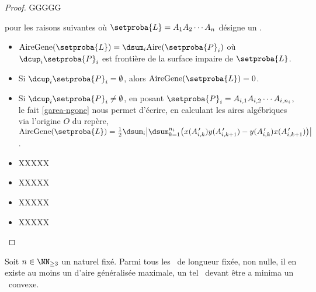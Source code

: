 \begin{proof}
	GGGGG
	
	
	pour les raisons suivantes où $\setproba{L} = A_1 A_2 \cdots A_n$ désigne un \ncycle.
    \begin{itemize}
        \item $\garea{\setproba{L}} = \dsum_{i} \area{\setproba{P}_i}$ où $\dcup_{i} \setproba{P}_i$ est frontière de la surface impaire de $\setproba{L}$.


		\item Si $\dcup_{i} \setproba{P}_i = \emptyset$, alors $\garea{\setproba{L}} = 0$.


		\item Si $\dcup_{i} \setproba{P}_i \neq \emptyset$, 
		en posant $\setproba{P}_i = A_{i,1} A_{i,2} \cdots A_{i,n_i}$, 
		le fait \ref{garea-ngone} nous permet d'écrire, en calculant les aires algébriques via l'origine $O$ du repère,
		$ \garea{\setproba{L}} 
		= \frac12 \dsum_{i} \big\lvert
			\dsum_{k=1}^{n_i} \big( 
				  x(A^{\,\prime}_{i,k}) y(A^{\,\prime}_{i,k+1}) 
				- y(A^{\,\prime}_{i,k}) x(A^{\,\prime}_{i,k+1})
			\big)
		 \big\rvert$
		.

		\item XXXXX

		\item XXXXX

		\item XXXXX

		\item XXXXX
    \end{itemize}

	\null\vspace{-6ex}
\end{proof}




\begin{fact} \label{suff-cond-ncycle}
    Soit $n \in \NN_{\geq3}$ un naturel fixé.
    Parmi tous les \ncycles\ de longueur fixée, non nulle, il en existe au moins un d'aire généralisée maximale, un tel \ncycle\ devant être a minima un \ngone\ convexe.
\end{fact}


